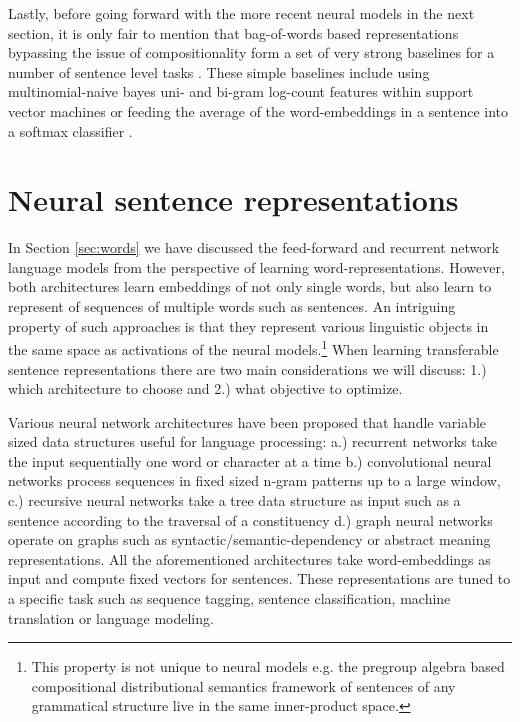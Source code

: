 Lastly, before going forward with the more recent neural models in the next section,
it is only fair to mention that bag-of-words
based representations bypassing the issue of compositionality form a set of very strong baselines
for a number of sentence level tasks \citep{hill2016learning}.
These simple baselines include using multinomial-naive bayes uni- and bi-gram 
log-count features within support vector machines \citep{wang2012baselines} or
feeding the average of the word-embeddings in a sentence into a softmax classifier \citep{joulin2016bag}.


\section{Neural sentence representations}
\label{sec:trans-sentence}

In Section \ref{sec:words} we have discussed the feed-forward \citep{bengio2003neural}
and recurrent network \citep{mikolov2010recurrent} language models from the perspective
of learning word-representations. However, both architectures learn embeddings of not only single words,
but also learn to represent of sequences of multiple words such as sentences.
An intriguing property of such approaches is that
they represent various linguistic objects in the same space as activations of the neural models.\footnote{This property is not unique to neural models e.g. the pregroup algebra based compositional distributional
semantics framework of \cite{coecke2010mathematical} 
sentences of any grammatical structure live in the same inner-product space.} 
When learning transferable
sentence representations there are two main considerations we will discuss:
1.) which architecture to choose and 2.) what objective to optimize.

Various neural network architectures have been proposed that
handle variable sized data structures useful for language processing: a.) recurrent networks 
take the input sequentially one word or character at a time
b.) convolutional neural networks
\citep{kalchbrenner2014convolutional,zhang2015character,conneau2016very,chen2013learning}
process sequences in fixed sized n-gram patterns up to a large window,
c.) recursive neural networks \citep{goller1996learning,socher2011parsing,tai2015improved}
take a tree data structure as input such as a sentence according to the traversal of a
constituency
d.) graph neural networks operate on graphs \citep{marcheggiani2017encoding} such as
syntactic/semantic-dependency or abstract meaning representations.
All the aforementioned architectures take word-embeddings as input 
and compute fixed vectors for sentences. 
These representations are tuned to a specific task such as sequence tagging,
sentence classification, machine translation or language modeling.


